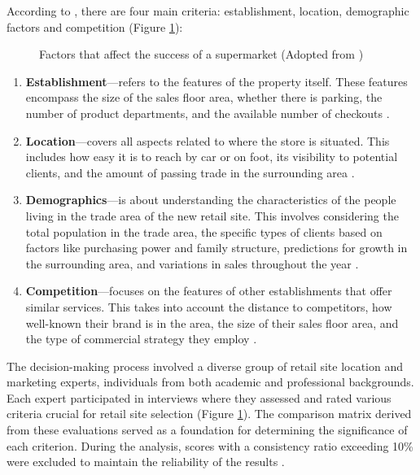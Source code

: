 According to \cite{roig2013retail}, there are four main criteria: establishment, location, demographic factors and competition (Figure \ref{fig:ahp-criteria}):

\begin{figure}[ht]
	\centering
	
	\caption{Factors that affect the success of a supermarket (Adopted from \cite{roig2013retail})}
	\label{fig:ahp-criteria}
\end{figure}

\begin{enumerate}
    \item \textbf{Establishment}---refers to the features of the property itself. These features encompass the size of the sales floor area, whether there is parking, the number of product departments, and the available number of checkouts \cite{roig2013retail}.
    \item \textbf{Location}---covers all aspects related to where the store is situated. This includes how easy it is to reach by car or on foot, its visibility to potential clients, and the amount of passing trade in the surrounding area \cite{roig2013retail}.
    \item \textbf{Demographics}---is about understanding the characteristics of the people living in the trade area of the new retail site. This involves considering the total population in the trade area, the specific types of clients based on factors like purchasing power and family structure, predictions for growth in the surrounding area, and variations in sales throughout the year \cite{roig2013retail}.
    \item \textbf{Competition}---focuses on the features of other establishments that offer similar services. This takes into account the distance to competitors, how well-known their brand is in the area, the size of their sales floor area, and the type of commercial strategy they employ \cite{roig2013retail}.
\end{enumerate}

The decision-making process involved a diverse group of retail site location and marketing experts, individuals from both academic and professional backgrounds. Each expert participated in interviews where they assessed and rated various criteria crucial for retail site selection (Figure \ref{fig:ahp-criteria}). The comparison matrix derived from these evaluations served as a foundation for determining the significance of each criterion. During the analysis, scores with a consistency ratio exceeding 10\% were excluded to maintain the reliability of the results \cite{roig2013retail}.


